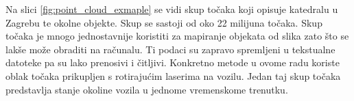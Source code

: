 Na slici \ref{fig:point_cloud_exmaple} se vidi skup točaka koji opisuje katedralu u Zagrebu te okolne objekte. Skup se sastoji od oko 22 milijuna točaka. Skup točaka je mnogo jednostavnije koristiti za mapiranje objekata od slika zato što se lakše može obraditi na računalu. Ti podaci su zapravo spremljeni u tekstualne datoteke pa su lako prenosivi i čitljivi. Konkretno metode u ovome radu koriste oblak točaka prikupljen s rotirajućim laserima na vozilu. Jedan taj skup točaka predstavlja stanje okoline vozila u jednome vremenskome trenutku.